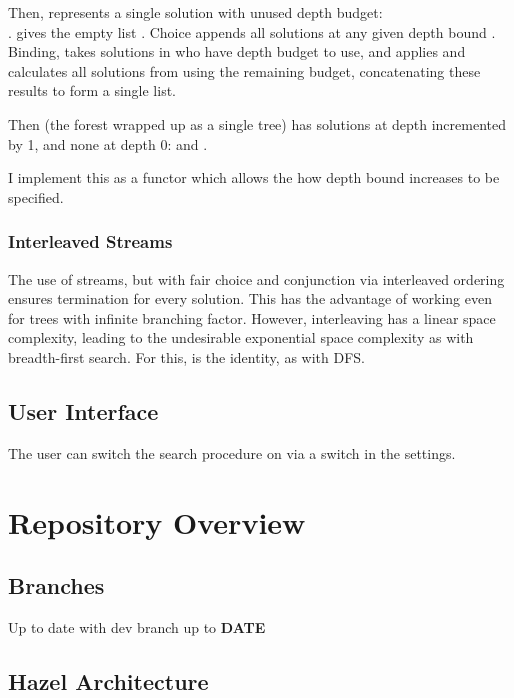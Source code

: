 Then,  represents a single solution with unused depth budget:\\
.  gives the empty list . Choice appends all solutions at any given depth bound . Binding,  takes solutions in  who have depth budget to use, and applies  and calculates all solutions from  using the remaining budget, concatenating these results to form a single list.

Then  (the forest  wrapped up as a single tree) has solutions at depth incremented by 1, and none at depth 0:  and .

I implement this as a functor which allows the how depth bound increases to be specified.


\subsubsection{Interleaved Streams}
The use of streams, but with fair choice and conjunction via interleaved ordering ensures termination for every solution. This has the advantage of working even for trees with infinite branching factor. However, interleaving has a linear space complexity, leading to the undesirable exponential space complexity as with breadth-first search. For this,  is the identity, as with DFS.

\subsection{User Interface}
The user can switch the search procedure on via a switch in the settings.

\section{Repository Overview}
\subsection{Branches}
Up to date with dev branch up to \textbf{DATE}

\subsection{Hazel Architecture}



